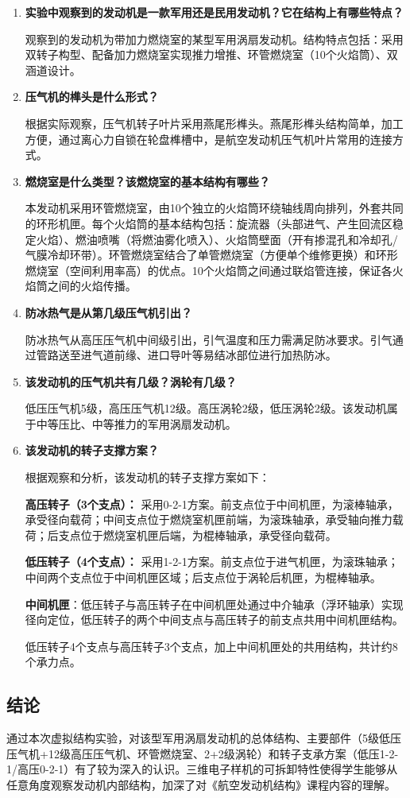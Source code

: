 \begin{enumerate}
    \item \textbf{实验中观察到的发动机是一款军用还是民用发动机？它在结构上有哪些特点？}

    观察到的发动机为带加力燃烧室的某型军用涡扇发动机。结构特点包括：采用双转子构型、配备加力燃烧室实现推力增推、环管燃烧室（10个火焰筒）、双涵道设计。

    \item \textbf{压气机的榫头是什么形式？}

    根据实际观察，压气机转子叶片采用燕尾形榫头。燕尾形榫头结构简单，加工方便，通过离心力自锁在轮盘榫槽中，是航空发动机压气机叶片常用的连接方式。

    \item \textbf{燃烧室是什么类型？该燃烧室的基本结构有哪些？}

    本发动机采用环管燃烧室，由10个独立的火焰筒环绕轴线周向排列，外套共同的环形机匣。每个火焰筒的基本结构包括：旋流器（头部进气、产生回流区稳定火焰）、燃油喷嘴（将燃油雾化喷入）、火焰筒壁面（开有掺混孔和冷却孔/气膜冷却环带）。环管燃烧室结合了单管燃烧室（方便单个维修更换）和环形燃烧室（空间利用率高）的优点。10个火焰筒之间通过联焰管连接，保证各火焰筒之间的火焰传播。

    \item \textbf{防冰热气是从第几级压气机引出？}

    防冰热气从高压压气机中间级引出，引气温度和压力需满足防冰要求。引气通过管路送至进气道前缘、进口导叶等易结冰部位进行加热防冰。

    \item \textbf{该发动机的压气机共有几级？涡轮有几级？}

    低压压气机5级，高压压气机12级。高压涡轮2级，低压涡轮2级。该发动机属于中等压比、中等推力的军用涡扇发动机。

    \item \textbf{该发动机的转子支撑方案？}

    根据观察和分析，该发动机的转子支撑方案如下：

    \textbf{高压转子（3个支点）：} 采用0-2-1方案。前支点位于中间机匣，为滚棒轴承，承受径向载荷；中间支点位于燃烧室机匣前端，为滚珠轴承，承受轴向推力载荷；后支点位于燃烧室机匣后端，为棍棒轴承，承受径向载荷。

    \textbf{低压转子（4个支点）：} 采用1-2-1方案。前支点位于进气机匣，为滚珠轴承；中间两个支点位于中间机匣区域；后支点位于涡轮后机匣，为棍棒轴承。

    \textbf{中间机匣}：低压转子与高压转子在中间机匣处通过中介轴承（浮环轴承）实现径向定位，低压转子的两个中间支点与高压转子的前支点共用中间机匣结构。

    低压转子4个支点与高压转子3个支点，加上中间机匣处的共用结构，共计约8个承力点。

\end{enumerate}

\subsection{结论}

通过本次虚拟结构实验，对该型军用涡扇发动机的总体结构、主要部件（5级低压压气机+12级高压压气机、环管燃烧室、2+2级涡轮）和转子支承方案（低压1-2-1/高压0-2-1）有了较为深入的认识。三维电子样机的可拆卸特性使得学生能够从任意角度观察发动机内部结构，加深了对《航空发动机结构》课程内容的理解。
